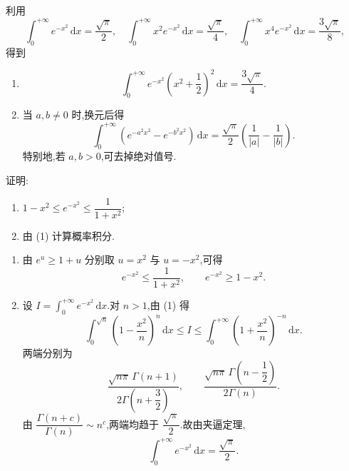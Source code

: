 \begin{solution}
  利用
  \[
    \int_0^{+\infty}e^{-x^2}\,\mathrm{d}x=\dfrac{\sqrt{\pi}}{2},
    \quad
    \int_0^{+\infty}x^2e^{-x^2}\,\mathrm{d}x=\dfrac{\sqrt{\pi}}{4},
    \quad
    \int_0^{+\infty}x^4e^{-x^2}\,\mathrm{d}x=\dfrac{3\sqrt{\pi}}{8},
  \]
  得到
  \begin{enumerate}
    \item
          \[
            \int_0^{+\infty}e^{-x^2}\left(x^2+\dfrac{1}{2}\right)^2\,\mathrm{d}x
            =\dfrac{3\sqrt{\pi}}{4}.
          \]
    \item 当 $a,b\neq0$ 时,换元后得
          \[
            \int_0^{+\infty}\left(e^{-a^2x^2}-e^{-b^2x^2}\right)\,\mathrm{d}x
            =\dfrac{\sqrt{\pi}}{2}\left(\dfrac{1}{|a|}-\dfrac{1}{|b|}\right).
          \]
          特别地,若 $a,b>0$,可去掉绝对值号.
  \end{enumerate}
\end{solution}

\begin{example}
  证明:
  \begin{enumerate}
    \item $1-x^2\leq e^{-x^2}\leq\dfrac{1}{1+x^2}$;
    \item 由 (1) 计算概率积分.
  \end{enumerate}
\end{example}
\exampleblank

\begin{solution}
  \begin{enumerate}
    \item 由 $e^u\geq1+u$ 分别取 $u=x^2$ 与 $u=-x^2$,可得
          \[
            e^{-x^2}\leq\dfrac{1}{1+x^2},
            \qquad
            e^{-x^2}\geq1-x^2.
          \]

    \item 设 $I=\displaystyle\int_0^{+\infty}e^{-x^2}\,\mathrm{d}x$.对 $n>1$,由 (1) 得
          \[
            \int_0^{\sqrt n}\left(1-\dfrac{x^2}{n}\right)^n\,\mathrm{d}x
            \leq I\leq
            \int_0^{+\infty}\left(1+\dfrac{x^2}{n}\right)^{-n}\,\mathrm{d}x.
          \]
          两端分别为
          \[
            \dfrac{\sqrt{n\pi}\,\Gamma(n+1)}{2\Gamma\left(n+\dfrac{3}{2}\right)},
            \qquad
            \dfrac{\sqrt{n\pi}\,\Gamma\left(n-\dfrac{1}{2}\right)}{2\Gamma(n)}.
          \]
          由 $\displaystyle\dfrac{\Gamma(n+c)}{\Gamma(n)}\sim n^c$,两端均趋于
          $\dfrac{\sqrt\pi}{2}$.故由夹逼定理,
          \[
            \int_0^{+\infty}e^{-x^2}\,\mathrm{d}x=\dfrac{\sqrt\pi}{2}.
          \]
  \end{enumerate}
\end{solution}



